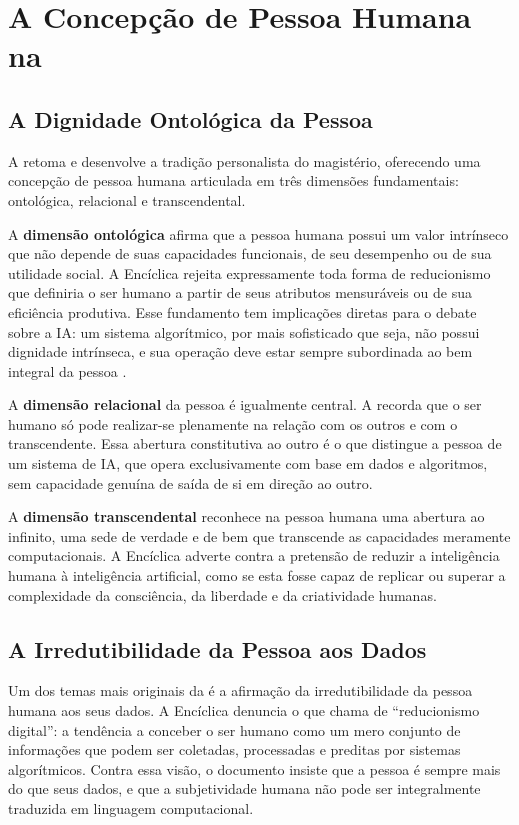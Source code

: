 \section{A Concepção de Pessoa Humana na \MH{}}
\label{sec:pessoa-mh}

\subsection{A Dignidade Ontológica da Pessoa}
\label{subsec:dignidade-ontologica}

A \MH{} retoma e desenvolve a tradição personalista do magistério, oferecendo uma concepção de pessoa humana articulada em três dimensões fundamentais: ontológica, relacional e transcendental.

A \textbf{dimensão ontológica} afirma que a pessoa humana possui um valor intrínseco que não depende de suas capacidades funcionais, de seu desempenho ou de sua utilidade social. A Encíclica rejeita expressamente toda forma de reducionismo que definiria o ser humano a partir de seus atributos mensuráveis ou de sua eficiência produtiva. Esse fundamento tem implicações diretas para o debate sobre a IA: um sistema algorítmico, por mais sofisticado que seja, não possui dignidade intrínseca, e sua operação deve estar sempre subordinada ao bem integral da pessoa \cite{LeaoXIV2026MH}.

A \textbf{dimensão relacional} da pessoa é igualmente central. A \MH{} recorda que o ser humano só pode realizar-se plenamente na relação com os outros e com o transcendente. Essa abertura constitutiva ao outro é o que distingue a pessoa de um sistema de IA, que opera exclusivamente com base em dados e algoritmos, sem capacidade genuína de saída de si em direção ao outro.

A \textbf{dimensão transcendental} reconhece na pessoa humana uma abertura ao infinito, uma sede de verdade e de bem que transcende as capacidades meramente computacionais. A Encíclica adverte contra a pretensão de reduzir a inteligência humana à inteligência artificial, como se esta fosse capaz de replicar ou superar a complexidade da consciência, da liberdade e da criatividade humanas.

\subsection{A Irredutibilidade da Pessoa aos Dados}
\label{subsec:irredutibilidade}

Um dos temas mais originais da \MH{} é a afirmação da irredutibilidade da pessoa humana aos seus dados. A Encíclica denuncia o que chama de ``reducionismo digital'': a tendência a conceber o ser humano como um mero conjunto de informações que podem ser coletadas, processadas e preditas por sistemas algorítmicos. Contra essa visão, o documento insiste que a pessoa é sempre mais do que seus dados, e que a subjetividade humana não pode ser integralmente traduzida em linguagem computacional.

